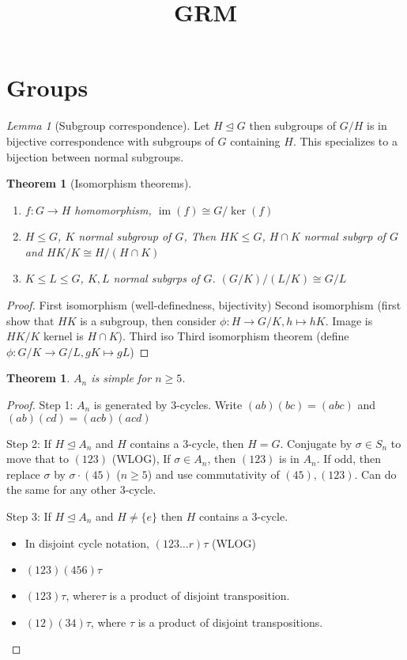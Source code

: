 \documentclass{article}
\title{GRM}
\author{ }
\date{ }
\theoremstyle{definition}
\theoremstyle{remark}
\newtheorem{lem}[defn]{Lemma}
\theoremstyle{plain}
\newtheorem{thm}[defn]{Theorem}
\theoremstyle{definition}
\begin{document}
\maketitle
\section{Groups}
\begin{lem}[Subgroup correspondence] Let $H\trianglelefteq G$ then subgroups of $G/H$ is in bijective correspondence with subgroups of $G$ containing $H$. This specializes to a bijection between normal subgroups.
\end{lem}
\begin{thm}[Isomorphism theorems]
    \begin{enumerate}
        \item $f:G\to H$ homomorphism, $\operatorname{im}(f)\cong G/\ker(f)$
        \item $H\le G$, $K$ normal subgroup of $G$, Then $HK\le G$, $H\cap K$ normal subgrp of $G$ and $HK/K\cong H/(H\cap K)$
        \item $K\le L\le G$, $K, L$ normal subgrps of $G$. $(G/K)/(L/K)\cong G/L$
    \end{enumerate}
\end{thm}
\begin{proof}
First isomorphism (well-definedness, bijectivity)
Second isomorphism (first show that $HK$ is a subgroup, then consider $\phi:H\to G/K, h\mapsto hK$. Image is $HK/K$ kernel is $H\cap K$). 
Third iso 
Third isomorphism theorem (define $\phi:G/K\to G/L, gK\mapsto gL$)
\end{proof}
\begin{thm}
    $A_n$ is simple for $n\ge 5$.
\end{thm}
\begin{proof}
    Step 1: $A_n$ is generated by $3$-cycles. Write $(ab)(bc)=(abc)$ and $(ab)(cd)=(acb)(acd)$
    
    Step 2: If $H\trianglelefteq A_n$ and $H$ contains a $3$-cycle, then $H=G$. Conjugate by $\sigma\in S_n$ to move that to $(123)$ (WLOG), If $\sigma\in A_n$, then $(123)$ is in $A_n$. If odd, then replace $\sigma$ by $\sigma\cdot (45)$ ($n\ge 5$) and use commutativity of $(45),(123)$. Can do the same for any other 3-cycle.
    
    Step 3: If $H\trianglelefteq A_n$ and $H\neq\{e\}$ then $H$ contains a $3$-cycle. 
    \begin{itemize}
        \item In disjoint cycle notation, $(123\ldots r)\tau$ (WLOG)
        \item $(123)(456)\tau$
        \item $(123)\tau$, where$\tau$ is a product of disjoint transposition.
        \item $(12)(34)\tau$, where $\tau$ is a product of disjoint transpositions.
    \end{itemize}
\end{proof}
\end{document}
